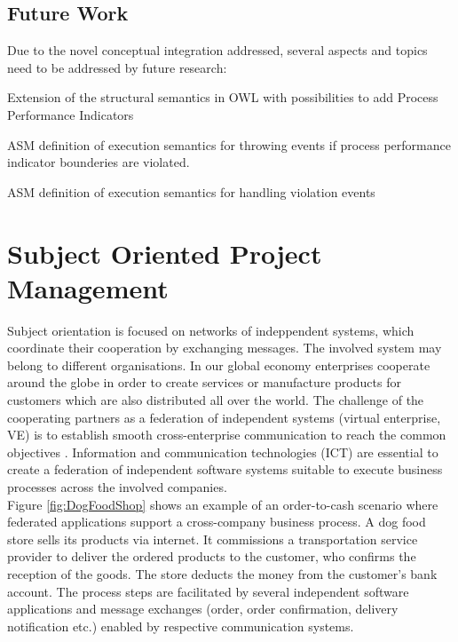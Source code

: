 \subsection{Future Work}

Due to the novel conceptual integration addressed, several aspects and topics need to be addressed by future research:
\begin{list}{-}{spacing}
	\item Extension of the structural semantics in OWL with possibilities to add Process Performance Indicators
	\item ASM definition of execution semantics for throwing events if process performance indicator bounderies are violated.
	\item ASM definition of execution semantics for handling violation events
\end{list}


\section{Subject Oriented Project Management}

Subject orientation is focused on networks of indeppendent systems, which coordinate their cooperation by exchanging messages. The involved system may belong to different organisations.
In our global economy enterprises cooperate around the globe in order to create services or manufacture products for customers which are also distributed all over the world. The challenge of the cooperating partners as a federation of independent systems (virtual enterprise, VE) is to establish smooth cross-enterprise communication to reach the common objectives \cite{article:VirtualEnterprise}. Information and communication technologies (ICT) are essential to create a federation of independent software systems suitable to execute business processes across the involved companies.
\\
Figure \ref{fig:DogFoodShop} shows an example of an order-to-cash scenario where federated applications support a cross-company business process. A dog food store sells its products via internet. It commissions a transportation service provider to deliver the ordered products to the customer, who confirms the reception of the goods. The store deducts the money from the customer's bank account. The process steps are facilitated by several independent software applications and message exchanges (order, order confirmation, delivery notification etc.) enabled by respective communication systems.


